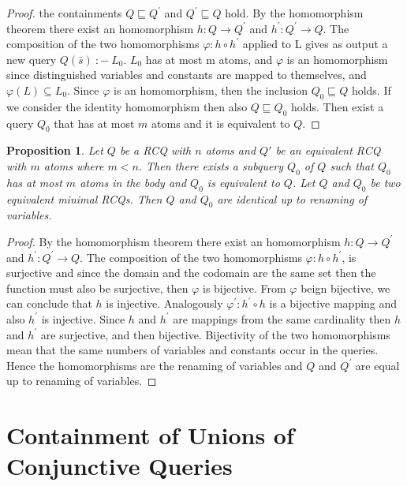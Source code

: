 \documentclass[a4paper,12pt]{article}
\newtheorem{prop}{Proposition}
\newcommand{\query}[3]{\ensuremath{{#1}({#2})\:{:}{-}\:{#3}}}
\renewcommand{\phi}{\varphi}
\begin{document}
\begin{proof}
the containments $Q \sqsubseteq Q^{'}$ and $Q^{'} \sqsubseteq Q$ hold. By the homomorphism theorem there exist an homomorphism $h : Q \rightarrow Q^{'} $ and $h^{'} : Q^{'} \rightarrow Q $. The composition of the two homomorphisms $\phi : h \circ h^{'}$ applied to L gives as output a new query $\query{Q}{\bar{s}}{L_0}$. $L_0$ has at most m atoms, and $\phi$ is an homomorphism since distinguished variables and constants are mapped to themselves, and $\phi (L) \subseteq L_0$.
Since $\phi$ is an homomorphism, then the inclusion $Q_0 \sqsubseteq Q$ holds. 
If we consider the identity homomorphism then also $Q \sqsubseteq Q_0$ holds. Then exist a query $Q_0$ that has at most $m$ atoms and it is equivalent to $Q$.

\end{proof}

\begin{prop} Let $Q$ be a RCQ with $n$ atoms and $Q'$ be an equivalent RCQ with $m$ atoms where $m < n$. Then there exists a subquery $Q_0$ of $Q$ such that $Q_0$ has at most $m$ atoms in the body and $Q_0$ is equivalent to $Q$.
Let $Q$ and $Q_0$ be two equivalent minimal RCQs. Then $Q$ and $Q_0$
are identical up to renaming of variables.
\end{prop}

\begin{proof}
By the homomorphism theorem there exist an homomorphism $h : Q \rightarrow Q^{'} $ and $h^{'} : Q^{'} \rightarrow Q $. The composition of the two homomorphisms $\phi : h \circ h^{'}$, is surjective and since the domain and the codomain are the same set then the function must also be surjective, then $\phi$ is bijective. From $\phi$ beign bijective, we can conclude that $h$ is injective. Analogously $\phi^{'} : h^{'} \circ h$ is a bijective mapping  and also $h^{'}$ is injective. Since $h$ and $h^{'}$ are  mappings from the same cardinality then $h$ and $h^{'}$ are surjective, and then bijective. Bijectivity of the two homomorphisms mean that the same numbers of variables and constants occur in the queries. Hence the homomorphisms are the renaming of variables and $Q$ and $Q^{'}$ are equal up to renaming of variables.


\end{proof}

\section{Containment of Unions of Conjunctive Queries}
\end{document}
